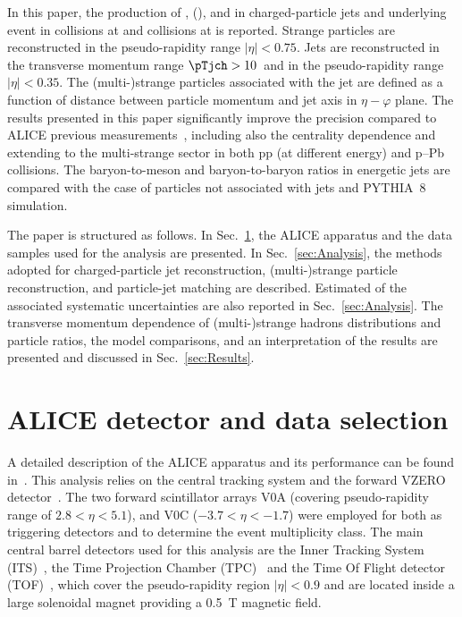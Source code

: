 \documentclass[ALICE,manyauthors]{cernphprep}
\begin{document}

In this paper, the production of \kzero, \lmb (\almb), \Xis and \Oms in charged-particle jets and underlying event in \pp collisions at \thirteen and \pPb collisions at \fivenn is reported.
Strange particles are reconstructed in the pseudo-rapidity range $|\eta| < 0.75$.
Jets are reconstructed in the transverse momentum range $\pTjch > 10$~\GeVc and in the pseudo-rapidity range $|\eta| < 0.35$.
The (multi-)strange particles associated with the jet are defined as a function of distance between particle momentum and jet axis in $\eta-\varphi$ plane.
The results presented in this paper significantly improve the precision  compared to ALICE previous measurements~\cite{Acharya:2021oaa}, including also the centrality dependence and extending to the multi-strange sector in both pp (at different energy) and p–Pb collisions.
The baryon-to-meson and baryon-to-baryon ratios in energetic jets are compared with the case of particles not associated with jets and PYTHIA~8~\cite{Sjostrand:2014zea} simulation.

The paper is structured as follows.
In Sec.~\ref{sec:Detector}, the ALICE apparatus and the data samples used for the analysis are presented. In Sec.~\ref{sec:Analysis}, the methods adopted for charged-particle jet reconstruction, (multi-)strange particle reconstruction, and particle-jet matching are described.
Estimated of the associated systematic uncertainties are also reported in Sec.~\ref{sec:Analysis}.
The transverse momentum dependence of (multi-)strange hadrons distributions and particle ratios, the model comparisons, and an interpretation of the results are presented and discussed in Sec.~\ref{sec:Results}.

\section{ALICE detector and data selection}%
\label{sec:Detector}

A detailed description of the ALICE apparatus and its performance can be found in~\cite{Collaboration_2008, Abelev:2014ffa}.
This analysis relies on the central tracking system and the forward VZERO detector~\cite{Abbas:2013taa}.
The two forward scintillator arrays V0A (covering pseudo-rapidity range of $2.8 < \eta < 5.1$), and V0C ($-3.7 < \eta < -1.7$) were employed for both as triggering detectors and to determine the event multiplicity class.
The main central barrel detectors used for this analysis are the Inner Tracking System (ITS)~\cite{Aamodt:2010aa}, the Time Projection Chamber (TPC)~\cite{Alme:2010ke} and the Time Of Flight detector (TOF)~\cite{Akindinov:2004cj, Akindinov:2009zze, Akindinov:2010zzb, Carnesecchi:2018oss}, which cover the pseudo-rapidity region $|\eta| < 0.9$ and are located inside a large solenoidal magnet providing a 0.5~T magnetic field.
\end{document}
